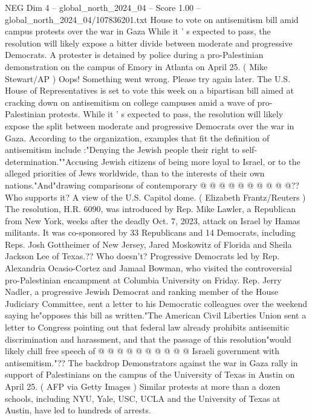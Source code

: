 \begin{textsample}{NEG Dim 4 – global\_north\_2024\_04 – Score 1.00 – global\_north\_2024\_04/107836201.txt}  \label{ex:f4_neg_097}
House to vote on antisemitism bill amid campus protests over the war in Gaza While it ' s expected to pass, the resolution will likely expose a bitter divide between moderate and progressive Democrats.
A protester is detained by police during a pro-Palestinian demonstration on the campus of Emory in Atlanta on April 25. ( Mike Stewart/AP ) Oops!
Something went wrong.
Please try again later.
The U.S.
House of Representatives is set to vote this week on a bipartisan bill aimed at cracking down on antisemitism on college campuses amid a wave of pro-Palestinian protests.
While it ' s expected to pass, the resolution will likely expose the split between moderate and progressive Democrats over the war in Gaza.
According to the organization, examples that fit the definition of antisemitism include :"Denying the Jewish people their right to self-determination.""Accusing Jewish citizens of being more loyal to Israel, or to the alleged priorities of Jews worldwide, than to the interests of their own nations."And"drawing comparisons of contemporary @ @ @ @ @ @ @ @ @ @??
Who supports it?
A view of the U.S.
Capitol dome. ( Elizabeth Frantz/Reuters ) The resolution, H.R. 6090, was introduced by Rep.
Mike Lawler, a Republican from New York, weeks after the deadly Oct. 7, 2023, attack on Israel by Hamas militants.
It was co-sponsored by 33 Republicans and 14 Democrats, including Reps.
Josh Gottheimer of New Jersey, Jared Moskowitz of Florida and Sheila Jackson Lee of Texas.??
Who doesn't?
Progressive Democrats led by Rep.
Alexandria Ocasio-Cortez and Jamaal Bowman, who visited the controversial pro-Palestinian encampment at Columbia University on Friday.
Rep.
Jerry Nadler, a progressive Jewish Democrat and ranking member of the House Judiciary Committee, sent a letter to his Democratic colleagues over the weekend saying he"opposes this bill as written."The American Civil Liberties Union sent a letter to Congress pointing out that federal law already prohibits antisemitic discrimination and harassment, and that the passage of this resolution"would likely chill free speech of @ @ @ @ @ @ @ @ @ @ Israeli government with antisemitism."??
The backdrop Demonstrators against the war in Gaza rally in support of Palestinians on the campus of the University of Texas in Austin on April 25. ( AFP via Getty Images ) Similar protests at more than a dozen schools, including NYU, Yale, USC, UCLA and the University of Texas at Austin, have led to hundreds of arrests.

\end{textsample}
